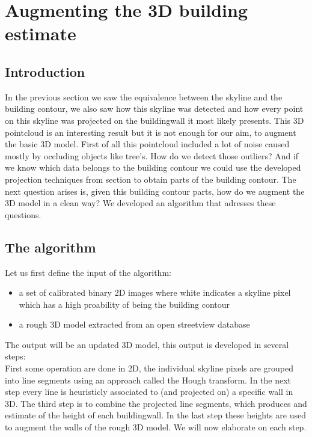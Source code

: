 
\section{Augmenting the 3D building estimate}
\subsection{Introduction}
In the previous section we saw the equivalence between the skyline and the building contour, we also saw how this skyline was detected and how every point on this skyline was projected on the buildingwall it most likely presents. 
This 3D pointcloud is an interesting result but it is not enough for our aim, to augment the basic 3D model.
First of all this pointcloud included a lot of noise caused mostly by occluding objects like tree's. How do we detect those outliers?
And if we know which data belongs to the building contour we could use the developed projection techniques from section %
to obtain parts of the building contour.
The next question arises is, given this building contour parts, how do we augment the 3D model in a clean way?
We developed an algorithm that adresses these questions.
\subsection{The algorithm}
Let us first define the input of the algorithm:
\begin{itemize}
	\item a set of calibrated binary 2D images where white indicates a skyline pixel which has a high proability of being the building contour
	\item a rough 3D model extracted from an open streetview database
\end{itemize}
The output will be an updated 3D model, this output is developed in several steps:\\
First some operation are done in 2D, the individual skyline pixels are grouped into line segments using an approach called the Hough transform. In the next step every line is heuristicly associated to (and projected on) a specific wall in 3D. The third step is to combine the projected line segments, which produces and estimate of the height of each buildingwall. In the last step these heights are used to augment the walls of the rough 3D model.
We will now elaborate on each step.

